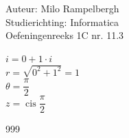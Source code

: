 \documentclass[a4paper]{article}
\begin{document}
\noindent \large Auteur: Milo Rampelbergh \\
\noindent \large Studierichting: Informatica\\
\noindent \large Oefeningenreeks 1C nr. 11.3\\

\medskip

\normalsize


$ i = 0+1 \cdot i $ \\

$ r = \sqrt{0^2 + 1^2} = 1 $ \\

$ \theta = \dfrac{\pi}{2}$ \\

$ z = \operatorname{cis} \dfrac{\pi}{2} $ \\


\begin{thebibliography}{999}
\end{thebibliography}
\end{document}
